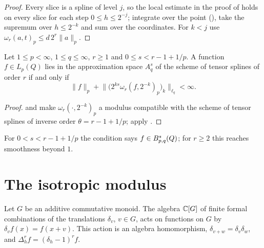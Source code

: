 \begin{proof}
\leanok
Every slice is a spline of level $j$, so the local estimate in the proof of
 holds on every slice for each step $0 \leq h \leq 2^{-j}$; integrate
over the point (), take the supremum over $h \leq 2^{-k}$ and sum over the
coordinates. For $k < j$ use $\omega_r(a, t)_p \leq d \, 2^r \|a\|_p$.
\end{proof}

\begin{theorem}
\label{thm:cube-spline-besov}
\leanok
{}
Let $1 \leq p < \infty$, $1 \leq q \leq \infty$, $r \geq 1$ and $0 \leq s < r - 1 + 1/p$. A
function $f \in L_p(Q)$ lies in the approximation space $A^s_q$ of the scheme of tensor splines of
order $r$ if and only if
\[
  \|f\|_p + \bigl\| \bigl( 2^{ks} \omega_r(f, 2^{-k})_p \bigr)_k \bigr\|_{\ell_q} < \infty .
\]
\end{theorem}

\begin{proof}
\leanok
{} and  make
$\omega_r(\cdot, 2^{-k})_p$ a modulus compatible with the scheme of tensor splines of inverse
order $\theta = r - 1 + 1/p$; apply .
\end{proof}

For $0 < s < r - 1 + 1/p$ the condition says $f \in B^{s}_{p,q}(Q)$; for $r \geq 2$ this
reaches smoothness beyond $1$.

\section{The isotropic modulus}
\label{sec:iso-modulus}

\begin{definition}
\label{def:translation-algebra}
\leanok
{}
Let $G$ be an additive commutative monoid. The algebra $\mathbb{C}[G]$ of finite formal combinations of
the translations $\delta_v$, $v \in G$, acts on functions on $G$ by $\delta_v f(x) = f(x + v)$.
This action is an algebra homomorphism, $\delta_{v + w} = \delta_v \delta_w$, and
$\Delta_h^r f = (\delta_h - 1)^r f$.
\end{definition}

